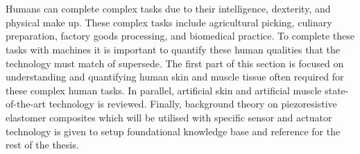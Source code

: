 \chapter{\chapiiname}
\label{chapter2}
Humans can complete complex tasks due to their intelligence, dexterity, and physical make up. These complex tasks include agricultural picking, culinary preparation, factory goods processing, and biomedical practice. To complete these tasks with machines it is important to quantify these human qualities that the technology must match of supersede. The first part of this section is focused on understanding and quantifying human skin and muscle tissue often required for these complex human tasks. In parallel, artificial skin and artificial muscle state-of-the-art technology is reviewed. Finally, background theory on piezoresistive elastomer composites which will be utilised with specific sensor and actuator technology is given to setup foundational knowledge base and reference for the rest of the thesis.


    
